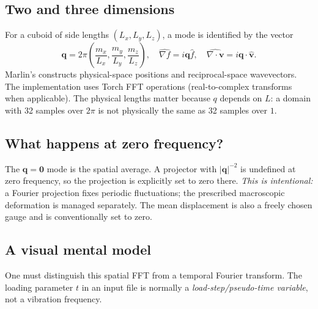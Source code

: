 \documentclass[11pt,a4paper]{article}
\newcommand{\code}[1]{\texttt{\detokenize{#1}}}
\begin{document}
\subsection{Two and three dimensions}
For a cuboid of side lengths $(L_x,L_y,L_z)$, a mode is identified by the vector
\begin{equation}
\mathbf q=2\pi\left(\frac{m_x}{L_x},\frac{m_y}{L_y},\frac{m_z}{L_z}\right),
\quad \widehat{\nabla f}=i\mathbf q\widehat f,
\quad \widehat{\nabla\cdot\mathbf v}=i\mathbf q\cdot\widehat{\mathbf v}.
\end{equation}
Marlin's \code{DomainAction} constructs physical-space positions and reciprocal-space wavevectors. The implementation uses Torch FFT operations (real-to-complex transforms when applicable). The physical lengths matter because $q$ depends on $L$: a domain with 32 samples over $2\pi$ is not physically the same as 32 samples over $1$.

\subsection{What happens at zero frequency?}
The $\mathbf q=\mathbf0$ mode is the spatial average. A projector with $|\mathbf q|^{-2}$ is undefined at zero frequency, so the projection is explicitly set to zero there. \emph{This is intentional:} a Fourier projection fixes periodic fluctuations; the prescribed macroscopic deformation is managed separately. The mean displacement is also a freely chosen gauge and is conventionally set to zero.

\subsection{A visual mental model}
\begin{center}
\end{center}
One must distinguish this spatial FFT from a temporal Fourier transform. The loading parameter $t$ in an input file is normally a \emph{load-step/pseudo-time variable}, not a vibration frequency.
\end{document}
